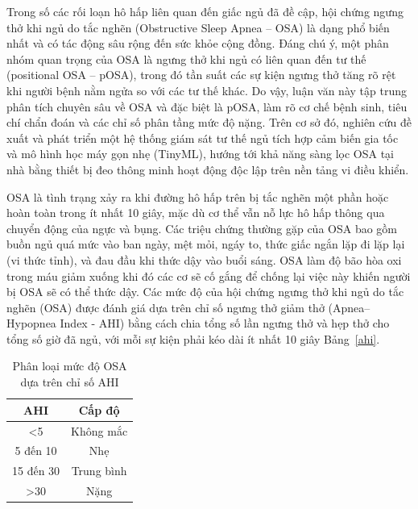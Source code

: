 Trong số các rối loạn hô hấp liên quan đến giấc ngủ đã đề cập, 
hội chứng ngưng thở khi ngủ do tắc nghẽn (Obstructive Sleep Apnea – OSA) 
là dạng phổ biến nhất và có tác động sâu rộng đến sức khỏe cộng đồng. 
Đáng chú ý, một phân nhóm quan trọng của OSA là ngưng thở khi ngủ 
có liên quan đến tư thế (positional OSA – pOSA), 
trong đó tần suất các sự kiện ngưng thở tăng rõ rệt khi người bệnh 
nằm ngửa so với các tư thế khác. 
Do vậy, luận văn này tập trung phân tích chuyên sâu về OSA và đặc biệt là pOSA, 
làm rõ cơ chế bệnh sinh, tiêu chí chẩn đoán và các chỉ số phân tầng mức độ nặng. 
Trên cơ sở đó, nghiên cứu đề xuất và phát triển một hệ thống giám sát tư thế ngủ tích hợp cảm biến gia tốc và 
mô hình học máy gọn nhẹ (TinyML), hướng tới khả năng sàng lọc OSA tại nhà bằng thiết bị đeo thông minh hoạt động độc lập trên nền tảng vi điều khiển.




\gls{OSA}\cite{osa_summary} là tình trạng xảy ra khi đường hô hấp trên bị tắc nghẽn một phần hoặc hoàn toàn trong ít nhất 10 giây, mặc dù cơ thể vẫn nỗ lực hô hấp thông qua chuyển động của ngực và bụng. Các triệu chứng thường gặp của OSA bao gồm buồn ngủ quá mức vào ban ngày, mệt mỏi, ngáy to, thức giấc ngắn lặp đi lặp lại (vi thức tỉnh), và đau đầu khi thức dậy vào buổi sáng. OSA làm độ bão hòa oxi trong máu giảm xuống khi đó các cơ sẽ cố gắng để chống lại việc này khiến người bị OSA sẽ có thể thức dậy. Các mức độ của hội chứng ngưng thở khi ngủ do tắc nghẽn (OSA) được đánh giá dựa trên chỉ số ngưng thở giảm thở (Apnea–Hypopnea Index - AHI) bằng cách chia tổng số lần ngưng thở và hẹp thở cho tổng số giờ đã ngủ, với mỗi sự kiện phải kéo dài ít nhất 10 giây Bảng~\ref{ahi}.

\begin{table}[h!]
\caption{\texorpdfstring{Phân loại mức độ OSA dựa trên chỉ số AHI}{Phân loại OSA}}
\label{ahi}
\vspace{-3mm}
\begin{center}
\begin{tabular}{|c|c|}
\hline
AHI & Cấp độ \\
\hline
<5 & Không mắc \\
5 đến 10 & Nhẹ \\
15 đến 30 & Trung bình \\
>30 & Nặng \\
\hline
\end{tabular}
\label{tab1}
\end{center}
\end{table}



